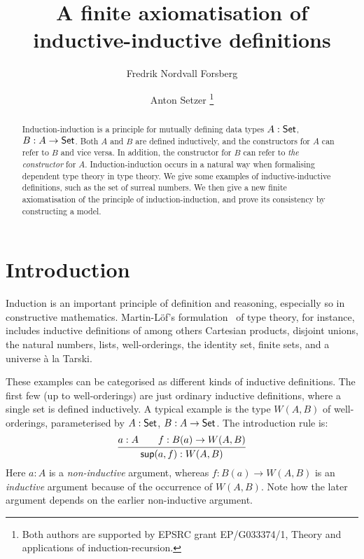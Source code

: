 \documentclass{article}
\title{A finite axiomatisation of inductive-inductive definitions}
\author{Fredrik Nordvall Forsberg}
\author{Anton Setzer \thanks{Both authors are supported by EPSRC grant EP/G033374/1, Theory and applications of induction-recursion.} }
\affil{Swansea University \\
Singleton  Park \\
Swansea SA2 8PP, UK}
\begin{document}
\maketitle

\begin{abstract}
  \noindent 
  Induction-induction is a principle for mutually defining data types
  $A : \mathsf{Set}$, $B : A \to \mathsf{Set}$. Both $A$ and $B$ are defined
  inductively, and the constructors for $A$ can refer to $B$ and vice
  versa. In addition, the constructor for $B$ can refer to \emph{the
    constructor} for $A$. Induction-induction occurs in a natural way
  when formalising dependent type theory in type theory.  We give some
  examples of inductive-inductive definitions, such as the set of
  surreal numbers. We then give a new finite axiomatisation of the
  principle of induction-induction, and prove its consistency by
  constructing a model.
\end{abstract}

\section{Introduction} %
\label{sec:introduction}

Induction is an important principle of definition and reasoning,
especially so in constructive mathematics.  Martin-L\"of's
formulation~\cite{martinlof1984bibliopolis} of type theory, for
instance, includes inductive definitions of among others Cartesian
products, disjoint unions, the natural numbers, lists, well-orderings,
the identity set, finite sets, and a universe \`a la
Tarski. %

These examples can be categorised as different kinds of inductive
definitions. The first few (up to well-orderings) are just ordinary inductive
definitions, where a single set is defined inductively. A typical
example is the type $W(A, B)$ of well-orderings, parameterised by $A : \mathsf{Set}$, $B
: A \to \mathsf{Set}$. The introduction rule is:
\[
\infer{\Wsup(a, f) : W(A, B)}{a : A & \quad f : B(a) \to W(A, B)}
\]
Here $a : A$ is a \emph{non-inductive} argument, whereas $f : B(a) \to
W(A, B)$ is an \emph{inductive} argument because of the occurrence of
$W(A, B)$. Note how the later argument depends on the earlier
non-inductive argument.
\end{document}
